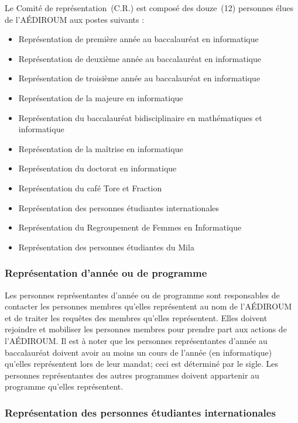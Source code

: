 \documentclass{aediroum}
\begin{document}
Le Comité de représentation~(C.R.) est composé des douze~(12) personnes élues de
l’AÉDIROUM aux postes suivants :
\begin{itemize}
\item Représentation de première année au baccalauréat en informatique
\item Représentation de deuxième année au baccalauréat en informatique
\item Représentation de troisième année au baccalauréat en informatique
\item Représentation de la majeure en informatique
\item Représentation du baccalauréat bidisciplinaire en mathématiques et informatique
\item Représentation de la maîtrise en informatique
\item Représentation du doctorat en informatique
\item Représentation du café Tore et Fraction
\item Représentation des personnes étudiantes internationales
\item Représentation du Regroupement de Femmes en Informatique
\item Représentation des personnes étudiantes du Mila
\end{itemize}

\subsubsection{Représentation d'année ou de programme}\label{sec:representant-dannee-ou-de-programme}

Les personnes représentantes d'année ou de programme sont responsables de contacter les personnes membres qu'elles représentent au nom de l'AÉDIROUM et de traiter les requêtes des membres qu'elles représentent. Elles doivent rejoindre et mobiliser les personnes membres pour prendre part aux actions de l'AÉDIROUM. Il est à noter que les personnes représentantes d'année au baccalauréat doivent avoir au moins un cours de l'année (en informatique) qu'elles représentent lors de leur mandat; ceci est déterminé par le sigle. Les personnes représentantes des autres programmes doivent appartenir au programme qu'elles représentent.

\subsubsection{Représentation des personnes étudiantes internationales}\label{sec:representant-des-etudiants-internationaux}
\end{document}
